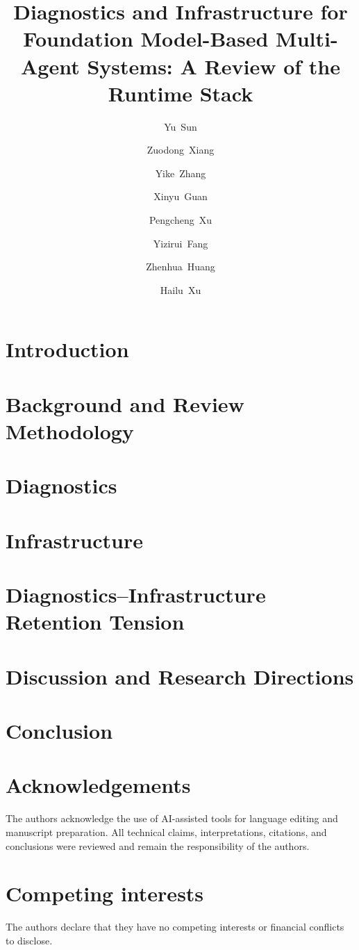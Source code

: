 \documentclass[review]{fcs}
\title{Diagnostics and Infrastructure for Foundation Model-Based Multi-Agent Systems: A Review of the Runtime Stack}
\author[1,+]{Yu~Sun}
\author[2]{Zuodong~Xiang}
\author[3]{Yike~Zhang}
\author[4]{Xinyu~Guan}
\author[5]{Pengcheng~Xu}
\author[3]{Yizirui~Fang}
\author[6]{Zhenhua~Huang}
\author[7]{Hailu~Xu}
\begin{document}
\section{Introduction}\label{sec:introduction}


\section{Background and Review Methodology}\label{sec:background}


\section{Diagnostics}\label{sec:diagnostics}


\section{Infrastructure}\label{sec:infrastructure}


\section{Diagnostics--Infrastructure Retention Tension}\label{sec:tension}


\section{Discussion and Research Directions}\label{sec:discussion}


\section{Conclusion}\label{sec:conclusion}


\fontsize{8.5pt}{10pt}\selectfont
\section*{Acknowledgements}
The authors acknowledge the use of AI-assisted tools for language editing and manuscript preparation. All technical claims, interpretations, citations, and conclusions were reviewed and remain the responsibility of the authors.

\section*{Competing interests}
The authors declare that they have no competing interests or financial conflicts to disclose.



\end{document}
